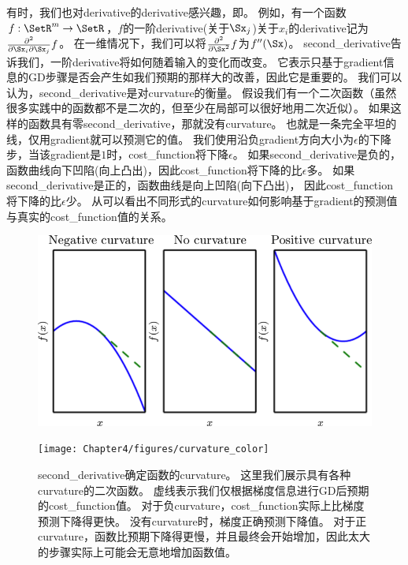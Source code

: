 有时，我们也对\gls{derivative}的\gls{derivative}感兴趣，即。
例如，有一个函数$f: \SetR^m \rightarrow \SetR$，$f$的一阶\gls{derivative}(关于$\Sx_j$)关于$x_i$的\gls{derivative}记为$\frac{\partial^2}{\partial \Sx_i \partial \Sx_j} f$。
在一维情况下，我们可以将$\frac{\partial^2}{\partial \Sx^2} f$为$f''(\Sx)$。
\gls{second_derivative}告诉我们，一阶\gls{derivative}将如何随着输入的变化而改变。
它表示只基于\gls{gradient}信息的\gls{GD}步骤是否会产生如我们预期的那样大的改善，因此它是重要的。
我们可以认为，\gls{second_derivative}是对\gls{curvature}的衡量。
假设我们有一个二次函数（虽然很多实践中的函数都不是二次的，但至少在局部可以很好地用二次近似）。
如果这样的函数具有零\gls{second_derivative}，那就没有\gls{curvature}。
也就是一条完全平坦的线，仅用\gls{gradient}就可以预测它的值。
我们使用沿负\gls{gradient}方向大小为$\epsilon$的下降步，当该\gls{gradient}是$1$时，\gls{cost_function}将下降$\epsilon$。
如果\gls{second_derivative}是负的，函数曲线向下凹陷(向上凸出)，因此\gls{cost_function}将下降的比$\epsilon$多。
如果\gls{second_derivative}是正的，函数曲线是向上凹陷(向下凸出)，
因此\gls{cost_function}将下降的比$\epsilon$少。
从可以看出不同形式的\gls{curvature}如何影响基于\gls{gradient}的预测值与真实的\gls{cost_function}值的关系。
\begin{figure}[!htb]
\ifOpenSource
\centerline{\includegraphics[scale=0.5]{images/27.png}}
\else
\centerline{\texttt{[image: Chapter4/figures/curvature\_color]}}
\fi
\caption{\gls{second_derivative}确定函数的\gls{curvature}。
这里我们展示具有各种\gls{curvature}的二次函数。
虚线表示我们仅根据梯度信息进行\gls{GD}后预期的\gls{cost_function}值。
对于负\gls{curvature}，\gls{cost_function}实际上比梯度预测下降得更快。
没有\gls{curvature}时，梯度正确预测下降值。
对于正\gls{curvature}，函数比预期下降得更慢，并且最终会开始增加，因此太大的步骤实际上可能会无意地增加函数值。
}
\label{fig:chap4_curvature_color}
\end{figure}

